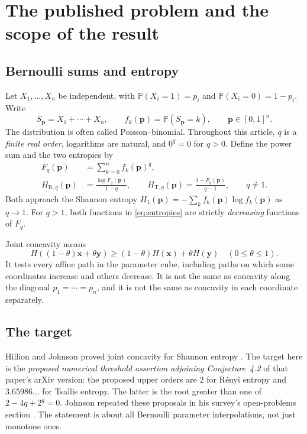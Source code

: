 \documentclass[11pt]{article}
\numberwithin{equation}{section}
\theoremstyle{definition}
\theoremstyle{remark}
\newcommand{\HR}{H_{\mathrm R,q}}
\newcommand{\HT}{H_{\mathrm T,q}}
\begin{document}
\section{The published problem and the scope of the result}
\subsection{Bernoulli sums and entropy}
Let $X_1,\ldots,X_n$ be independent, with
$\mathbb P(X_i=1)=p_i$ and $\mathbb P(X_i=0)=1-p_i$. Write
\begin{equation}
 S_{\boldsymbol p}=X_1+\cdots+X_n,\qquad
 f_k(\boldsymbol p)=\mathbb P(S_{\boldsymbol p}=k),\qquad
 \boldsymbol p\in[0,1]^n.
\end{equation}
The distribution is often called Poisson--binomial. Throughout this article,
$q$ is a \emph{finite real order}, logarithms are natural, and $0^q=0$ for
$q>0$. Define the power sum and the two entropies by
\begin{align}
 F_q(\boldsymbol p)&=\sum_{k=0}^n f_k(\boldsymbol p)^q,\label{eq:powersum}\\
 \HR(\boldsymbol p)&=\frac{\log F_q(\boldsymbol p)}{1-q},\qquad
 \HT(\boldsymbol p)=\frac{1-F_q(\boldsymbol p)}{q-1},\qquad q\ne1.
 \label{eq:entropies}
\end{align}
Both approach the Shannon entropy
$H_1(\boldsymbol p)=-\sum_k f_k(\boldsymbol p)\log f_k(\boldsymbol p)$ as
$q\to1$. For $q>1$, both functions in \eqref{eq:entropies} are strictly
\emph{decreasing} functions of $F_q$.

Joint concavity means
\begin{equation}
 H((1-\theta)\boldsymbol x+\theta\boldsymbol y)
 \geq (1-\theta)H(\boldsymbol x)+\theta H(\boldsymbol y)
 \quad(0\leq\theta\leq1).\label{eq:jensen}
\end{equation}
It tests every affine path in the parameter cube, including paths on which
some coordinates increase and others decrease. It is not the same as
concavity along the diagonal $p_1=\cdots=p_n$, and it is not the same as
concavity in each coordinate separately.

\subsection{The target}
Hillion and Johnson proved joint concavity for Shannon entropy
\cite[Theorem~1.2]{HJ2017}. The target here is the \emph{proposed numerical
threshold assertion adjoining Conjecture~4.2} of that paper's arXiv version:
the proposed upper orders are $2$ for R\'enyi entropy and $3.65986\ldots$ for
Tsallis entropy. The latter is the root greater than one of
$2-4q+2^q=0$. Johnson repeated these proposals in his survey's open-problems
section \cite[Section~8, item~5]{J2017}. The statement is about all Bernoulli
parameter interpolations, not just monotone ones.
\end{document}
